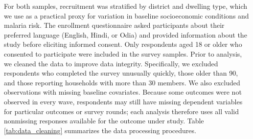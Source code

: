 For both samples, recruitment was stratified by district and dwelling type, which we use as a practical proxy for variation in baseline socioeconomic conditions and malaria risk. The enrollment questionnaire asked participants about their preferred language (English, Hindi, or Odia) and provided information about the study before eliciting informed consent. Only respondents aged 18 or older who consented to participate were included in the survey samples. Prior to analysis, we cleaned the data to improve data integrity. Specifically, we excluded respondents who completed the survey unusually quickly, those older than 90, and those reporting households with more than 30 members. We also excluded observations with missing baseline covariates. Because some outcomes were not observed in every wave, respondents may still have missing dependent variables for particular outcomes or survey rounds; each analysis therefore uses all valid nonmissing responses available for the outcome under study. Table \ref{tab:data_cleaning} summarizes the data processing procedures.

\begin{table}[p]
\vspace{-2cm}
\centering
\footnotesize
\caption{Data sources, processing, and output}
\label{tab:data_cleaning}

\end{table}

